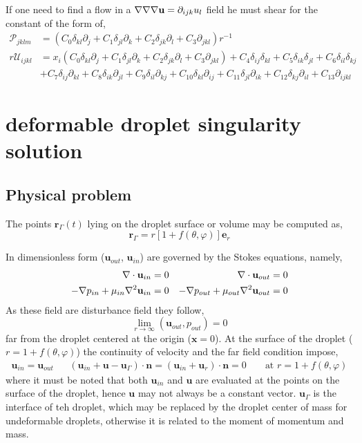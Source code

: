 If one need to find a flow in a $\mathbf{\nabla}\mathbf{\nabla}\mathbf{\nabla} \textbf{u} = \partial_{ijk}u_l$ field he must shear for the constant of the form of, 
\begin{align}
    \mathcal{P}_{jklm}
    &=
    (C_0 \delta_{kl}\partial_j
    + C_1 \delta_{jl}\partial_k
    + C_2 \delta_{jk}\partial_l
    + C_3 \partial_{jkl}
    )r^{-1}\\
    r \mathcal{U}_{ijkl}
    &=
    x_i 
    (C_0 \delta_{kl}\partial_j
    + C_1 \delta_{jl}\partial_k
    + C_2 \delta_{jk}\partial_l
    + C_3 \partial_{jkl})
    + C_4\delta_{ij}\delta_{kl}
    + C_5\delta_{ik}\delta_{jl}
    + C_6\delta_{il}\delta_{kj}\\
    &
    + C_7\delta_{ij}\partial_{kl}
    + C_8\delta_{ik}\partial_{jl}
    + C_9\delta_{il}\partial_{kj}
    + C_{10}\delta_{kl}\partial_{ij}
    + C_{11}\delta_{jl}\partial_{ik}
    + C_{12}\delta_{kj}\partial_{il}
    + C_{13}\partial_{ijkl}
\end{align}

\section{deformable droplet singularity solution}
\subsection{Physical problem}
The points $\textbf{r}_\Gamma(t)$ lying on the droplet surface or volume may be computed as,
\begin{equation}
    \textbf{r}_\Gamma = r [1 + f(\theta,\varphi)]\textbf{e}_r
\end{equation}


In dimensionless form ($\textbf{u}_{out}$, $\textbf{u}_{in}$) are governed by the Stokes equations, namely, 
\begin{align}
    \mathbf{\nabla}\cdot \textbf{u}_{in} = 0 
    && \mathbf{\nabla}\cdot \textbf{u}_{out} = 0 \\
    -\mathbf{\nabla} p_{in} + \mu_{in}\mathbf{\nabla}^2 \textbf{u}_{in}  = 0 
    &&-\mathbf{\nabla} p_{out} + \mu_{out}\mathbf{\nabla}^2 \textbf{u}_{out}  = 0 
\end{align}
As these field are disturbance field they follow,
\begin{equation}
    \lim_{r\to \infty}(\textbf{u}_{out},p_{out}) = 0 
\end{equation}
far from the droplet centered at the origin ($\textbf{x} = 0$). 
At the surface of the droplet ($r = 1 + f(\theta,\varphi)$) the continuity of velocity and the far field condition impose, 
\begin{align}
    \textbf{u}_{in} = \textbf{u}_{out}
    && 
    (\textbf{u}_{in}  + \textbf{u} - \textbf{u}_\Gamma)\cdot \textbf{n}
    = (\textbf{u}_{in}  + \textbf{u}_r)\cdot \textbf{n}
    = 0
    &&
    \text{ at }
    r = 1 + f(\theta,\varphi)
\end{align}
where it must be noted that both $\textbf{u}_{in}$ and $\textbf{u}$ are evaluated at the points on the surface of the droplet, hence $\textbf{u}$ may not always be a constant vector. 
$\textbf{u}_\Gamma$ is the interface of teh droplet, which may be replaced by the droplet center of mass for undeformable droplets, otherwise it is related to the moment of momentum and mass. 


